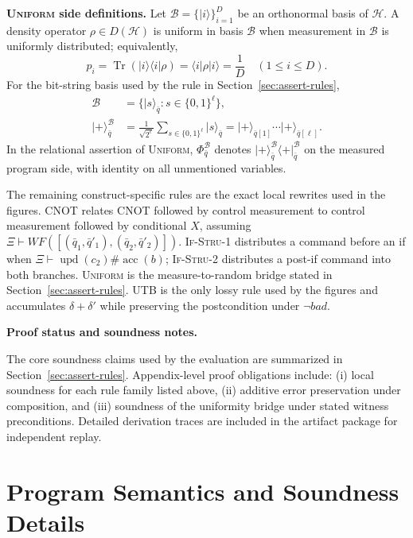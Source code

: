 \documentclass[conference,compsoc]{IEEEtran}
\providecommand{\ket}[1]{\lvert #1\rangle}
\providecommand{\bra}[1]{\langle #1\rvert}
\begin{document}
\smallskip
\noindent\textbf{\textsc{Uniform} side definitions.}
Let \(\mathcal B=\{\ket i\}_{i=1}^{D}\) be an orthonormal basis of
\(\mathcal H\). A density operator \(\rho\in D(\mathcal H)\) is uniform in
basis \(\mathcal B\) when measurement in \(\mathcal B\) is uniformly
distributed; equivalently,
\[
p_i=\operatorname{Tr}(\ket i\bra i\rho)=\langle i|\rho|i\rangle=\frac1D
\quad(1\le i\le D).
\]
For the bit-string basis used by the rule in Section~\ref{sec:assert-rules},
\[
\begin{aligned}
\mathcal B&=\{\ket{s}_{\bar q}:s\in\{0,1\}^{\ell}\},\\
\ket{+}^{\mathcal B}_{\bar q}
&=
\frac{1}{\sqrt{2^\ell}}\sum_{s\in\{0,1\}^{\ell}}\ket{s}_{\bar q}
=
\ket{+}_{\bar q[1]}\cdots\ket{+}_{\bar q[\ell]}.
\end{aligned}
\]
In the relational assertion of \textsc{Uniform},
\(\Phi_{\bar q}^{\mathcal B}\) denotes
\(\ket{+}^{\mathcal B}_{\bar q}\bra{+}^{\mathcal B}_{\bar q}\) on the measured
program side, with identity on all unmentioned variables.

The remaining construct-specific rules are the exact local rewrites used in the figures. \textsc{CNOT} relates CNOT followed by control measurement to control measurement followed by conditional \(X\), assuming \(\Xi\vdash WF([(\bar q_1,\bar q'_1),(\bar q_2,\bar q'_2)])\). \textsc{If-Stru-1} distributes a command before an if when \(\Xi\vdash\operatorname{upd}(c_2)\#\operatorname{acc}(b)\); \textsc{If-Stru-2} distributes a post-if command into both branches. \textsc{Uniform} is the measure-to-random bridge stated in Section~\ref{sec:assert-rules}. \textsc{UTB} is the only lossy rule used by the figures and accumulates \(\delta+\delta'\) while preserving the postcondition under \(\neg bad\).

\smallskip
\noindent\textbf{Proof status and soundness notes.}
\label{app:soundness}

The core soundness claims used by the evaluation are summarized in Section~\ref{sec:assert-rules}. Appendix-level proof obligations include: (i) local soundness for each rule family listed above, (ii) additive error preservation under composition, and (iii) soundness of the uniformity bridge under stated witness preconditions. Detailed derivation traces are included in the artifact package for independent replay.
\endgroup

\section{Program Semantics and Soundness Details}
\label{app:semantics-soundness}
\end{document}
